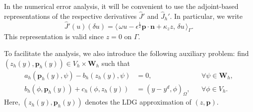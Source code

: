 \documentclass[a4paper,10pt]{article}
\newcommand{\hF}{{\frac{1}{2}}}
\newcommand{\bw}{{\mathbf{w}}}
\newcommand{\bp}{{\mathbf{p}}}
\newcommand{\bn}{{\mathbf{n}}}
\newcommand{\bW}{{\mathbf{W}}}
\newtheorem{lemma}[theorem]{Lemma}
\numberwithin{theorem}{section}
\newcommand{\x}[2][blue]{#2}
\begin{document}
In the numerical error analysis, it will be convenient to use the adjoint-based representations of the respective derivatives $\widehat J'$ and $\widehat J_h'$. \x{In particular, we write
\begin{equation}\label{adj-deriv-z}
\widehat J'(u)(\delta u)  = \langle\, \omega u - \epsilon^{\hF} \mathbf{p}\cdot \bn + \kappa_z z,\, \delta u\, \rangle_{\Gamma}.
\end{equation}
This representation is valid since $z=0$ on $\Gamma$.}

To facilitate the analysis, we also introduce the following auxiliary problem: find $(z_h(y), \bp_h(y)) \in V_h \times \bW_h$ such that
\begin{subequations}\label{aux2}
\begin{align}
a_h(\bp_h(y), \psi) - b_h(z_h(y), \psi) &= 0,
    && \forall \psi \in \bW_h, \\[4pt]
b_h(\phi, \bp_h(y)) + c_h(\phi, z_h(y)) &= (y - y^d, \phi)_\Omega,
    && \forall \phi \in V_h.
\end{align}
\end{subequations}
Here, $(z_h(y), \bp_h(y))$ denotes the LDG approximation of $(z, \bp)$. 
\end{document}

